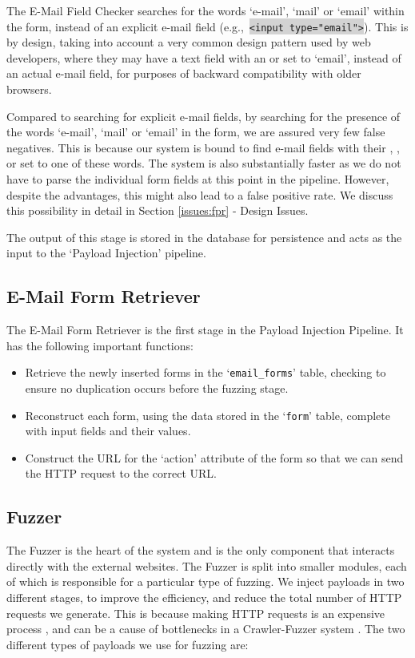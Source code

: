 The E-Mail Field Checker searches for the words `e-mail', `mail' or `email' within the form, instead of an explicit e-mail field (e.g.,\ \colorbox{lightgray}{\lstinline{<input type="email">}}). This is by design, taking into account a very common design pattern used by web developers, where they may have a text field with an  or  set to `email', instead of an actual e-mail field, for purposes of backward compatibility with older browsers.

Compared to searching for explicit e-mail fields, by searching for the presence of the words `e-mail', `mail' or `email' in the form, we are assured very few false negatives. This is because our system is bound to find e-mail fields with their , , or  set to one of these words. The system is also substantially faster as we do not have to parse the individual form fields at this point in the pipeline. However, despite the advantages, this might also lead to a false positive rate. We discuss this possibility in detail in Section \ref*{issues:fpr} - Design Issues. 

The output of this stage is stored in the database for persistence and acts as the input to the `Payload Injection' pipeline.


\subsection{E-Mail Form Retriever}
\label{Comp:EMFR}
The E-Mail Form Retriever is the first stage in the Payload Injection Pipeline. It has the following important functions:
\begin{itemize}
	\item Retrieve the newly inserted forms in the `\lstinline{email_forms}' table, checking to ensure no duplication occurs before the fuzzing stage.
	\item Reconstruct each form, using the data stored in the `\lstinline{form}' table, complete with input fields and their values.
	\item Construct the URL for the `action' attribute of the form so that we can send the HTTP request to the correct URL. 
\end{itemize}

\subsection{Fuzzer}
\label{Comp:Fuzzer}
The Fuzzer is the heart of the system and is the only component that interacts directly with the external websites. The Fuzzer is split into smaller modules, each of which is responsible for a particular type of fuzzing.  We inject payloads in two different stages, to improve the efficiency, and reduce the total number of HTTP requests we generate. This is because making HTTP requests is an expensive process \cite{McGrath2009}, and can be a cause of bottlenecks in a Crawler-Fuzzer system \cite{ShkapenyukTorstenSuel2001}.
The two different types of payloads we use for fuzzing are:
